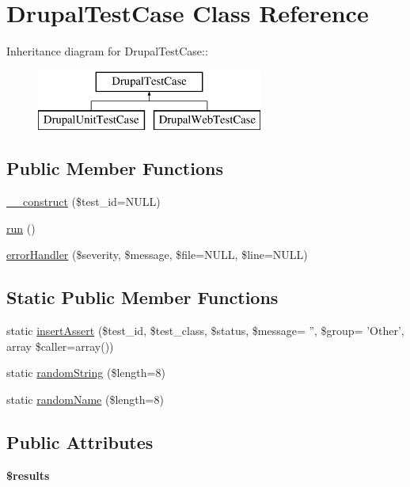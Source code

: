 \hypertarget{class_drupal_test_case}{
\section{DrupalTestCase Class Reference}
\label{class_drupal_test_case}
}
Inheritance diagram for DrupalTestCase::\begin{figure}[H]
\begin{center}
\leavevmode
\includegraphics[height=2cm]{class_drupal_test_case}
\end{center}
\end{figure}
\subsection*{Public Member Functions}
\begin{DoxyCompactItemize}
\item 
\hyperlink{class_drupal_test_case_abb2516192da25b89bec5f5a4a7e91aab}{\_\-\_\-construct} (\$test\_\-id=NULL)
\item 
\hyperlink{class_drupal_test_case_a01b1f3d8f92bb804dbfbbb9c03664a8e}{run} ()
\item 
\hyperlink{class_drupal_test_case_aaddb077405f3177d94d44b690b1d869f}{errorHandler} (\$severity, \$message, \$file=NULL, \$line=NULL)
\end{DoxyCompactItemize}
\subsection*{Static Public Member Functions}
\begin{DoxyCompactItemize}
\item 
static \hyperlink{class_drupal_test_case_add756d567d09f64668d57eb02be5b9fe}{insertAssert} (\$test\_\-id, \$test\_\-class, \$status, \$message= '', \$group= 'Other', array \$caller=array())
\item 
static \hyperlink{class_drupal_test_case_abfa086de79b5d644f10d4bd4d828136c}{randomString} (\$length=8)
\item 
static \hyperlink{class_drupal_test_case_ab1137ec76434cdd38ec267977ba153d5}{randomName} (\$length=8)
\end{DoxyCompactItemize}
\subsection*{Public Attributes}
\begin{DoxyCompactItemize}
\item 
{\bfseries \$results}
\end{DoxyCompactItemize}
